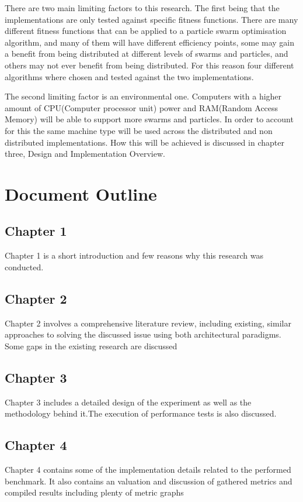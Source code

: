 \documentclass[oneside,12pt]{book}
\begin{document}
There are two main limiting factors to this research. The first being that the implementations are only tested against specific fitness functions. There are many different fitness functions that can be applied to a particle swarm optimisation algorithm, and many of them will have different efficiency points, some may gain a benefit from being distributed at different levels of swarms and particles, and others may not ever benefit from being distributed. For this reason four different algorithms where chosen and tested against the two implementations. 

The second limiting factor is an environmental one. Computers with a higher amount of CPU(Computer processor unit) power and RAM(Random Access Memory) will be able to support more swarms and particles. In order to account for this the same machine type will be used across the distributed and non distributed implementations. How this will be achieved is discussed in chapter three, Design and Implementation Overview. 

\section{Document Outline}
\subsection{Chapter 1}
Chapter 1 is a short introduction and few reasons why this research was conducted.
\subsection{Chapter 2}
Chapter 2 involves a comprehensive literature review, including existing, similar approaches  to  solving the discussed issue using both architectural paradigms. Some gaps in the existing research  are discussed
\subsection{Chapter 3}
Chapter 3 includes a detailed design of the experiment as well as the methodology behind it.The execution of performance tests is also discussed.
\subsection{Chapter 4}
Chapter 4 contains some of the implementation details related to the performed benchmark. It also contains an valuation and discussion of gathered metrics and compiled results including plenty of metric graphs
\end{document}
